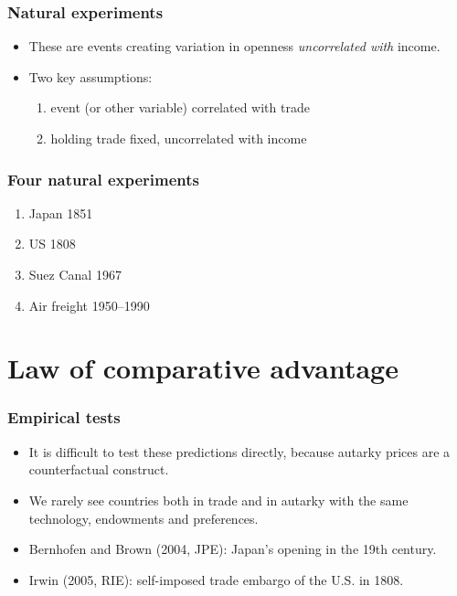 \documentclass[compress,mathserif,aspectratio=169]{beamer}
\begin{document}
\begin{frame}\frametitle{Natural experiments}\hypertarget{Natural experiments}{}
\begin{itemize}
\item These are events creating variation in openness \emph{uncorrelated with} income.

\item Two key assumptions:
\begin{enumerate}\setcounter{enumi}{0}
\item event (or other variable) correlated with trade

\item holding trade fixed, uncorrelated with income




\end{enumerate}

\end{itemize}
\end{frame}



\begin{frame}\frametitle{Four natural experiments}\hypertarget{Four natural experiments}{}
\begin{enumerate}\setcounter{enumi}{0}
\item Japan 1851

\item US 1808

\item Suez Canal 1967

\item Air freight 1950--1990




\end{enumerate}
\end{frame}







\section{Law of comparative advantage}\hypertarget{Law of comparative advantage}{}
\begin{frame}\frametitle{Empirical tests}\hypertarget{Empirical tests}{}
\begin{itemize}
\item It is difficult to test these predictions directly, because autarky prices are a counterfactual construct.

\item We rarely see countries both in trade and in autarky with the same technology, endowments and preferences.

\item Bernhofen and Brown (2004, JPE): Japan's opening in the 19th century.

\item Irwin (2005, RIE): self-imposed trade embargo of the U.S. in 1808.


\end{itemize}
\end{frame}
\end{document}
